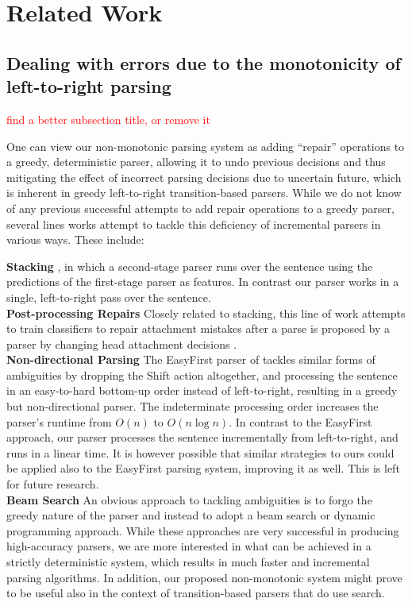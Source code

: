\documentclass[11pt,letterpaper]{article}
\newcommand{\note}[1]{\textcolor{red}{#1}}
\begin{document}
\section{Related Work}

\subsection{Dealing with errors due to the monotonicity of left-to-right parsing}
\note{find a better subsection title, or remove it}

One can view our non-monotonic parsing system as adding ``repair'' operations to a greedy, deterministic parser, allowing it to undo previous decisions and thus mitigating the effect of incorrect parsing decisions due to uncertain future, which is inherent in greedy left-to-right transition-based parsers. 
While we do not know of any previous successful attempts to add repair operations to a greedy parser, several lines works attempt to tackle this deficiency of incremental parsers in various ways. These include:

\noindent\textbf{Stacking} \cite{nivremcdonald,noahsmith}, in which a second-stage parser runs over the sentence using the predictions of the first-stage parser as features. In contrast our parser works in a single, left-to-right pass over the sentence.\\
\noindent\textbf{Post-processing Repairs} Closely related to stacking, this line of work attempts to train classifiers to repair attachment mistakes after a parse is proposed by a parser by changing head attachment decisions \cite{attardi,kbhall,leroux}.\\
\noindent\textbf{Non-directional Parsing} The EasyFirst parser of \cite{goldberg10} tackles similar forms of ambiguities by dropping the Shift action altogether, and processing the sentence in an easy-to-hard bottom-up order instead of left-to-right, resulting in a greedy but non-directional parser.  The indeterminate processing order increases the parser's runtime from $O(n)$ to $O(n\log{}n)$.  In contrast to the EasyFirst approach, our parser processes the sentence incrementally from left-to-right, and runs in a linear time.  It is however possible that similar strategies to ours could be applied also to the EasyFirst parsing system, improving it as well. This is left for future research.\\
\noindent\textbf{Beam Search} An obvious approach to tackling ambiguities is to forgo the greedy nature of the parser and instead to adopt a beam search \cite{zhang-clark,zhang-nivre} or dynamic programming \cite{huang,satta} approach. While these approaches are very successful in producing high-accuracy parsers, we are more interested in what can be achieved in a strictly deterministic system, which results in much faster and incremental parsing algorithms.  In addition, our proposed non-monotonic system might prove to be useful also in the context of transition-based parsers that do use search.
\end{document}
